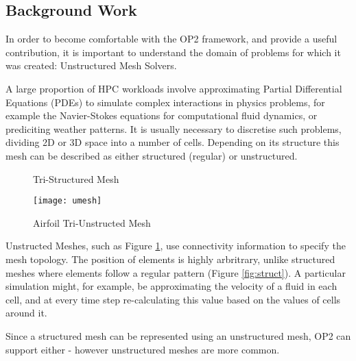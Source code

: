 \subsection{Background Work}
\label{s:bgwork}

In order to become comfortable with the OP2 framework, and provide a useful contribution, it is important to understand the domain of problems for which it was created: Unstructured Mesh Solvers.
\par
A large proportion of HPC workloads involve approximating Partial Differential Equations (PDEs) to simulate complex interactions in physics problems, for example the Navier-Stokes equations for computational fluid dynamics, or prediciting weather patterns. It is usually necessary to discretise such problems, dividing 2D or 3D space into a number of cells. Depending on its structure this mesh can be described as either structured (regular) or unstructured.

\begin{figure}[h!]
  \begin{minipage}{.5\textwidth}
    \centering
    \caption{Tri-Structured Mesh}
    \label{fig:struct}
  \end{minipage}
  \begin{minipage}{.5\textwidth}
    \centering
    \texttt{[image: umesh]}
    \caption{Airfoil Tri-Unstructed Mesh}
    \label{fig:umesh}
  \end{minipage}
\end{figure}
Unstructed Meshes, such as Figure \ref{fig:umesh}, use connectivity information to specify the mesh topology. The position of elements is highly arbritrary, unlike structured meshes where elements follow a regular pattern (Figure \ref{fig:struct}). A particular simulation might, for example, be approximating the velocity of a fluid in each cell, and at every time step re-calculating this value based on the values of cells around it.
\par
Since a structured mesh can be represented using an unstructured mesh, OP2 can support either - however unstructured meshes are more common.

